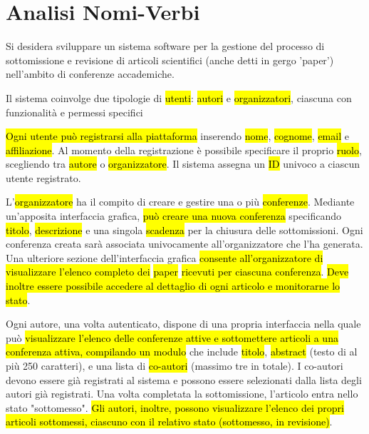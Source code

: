 \section{Analisi Nomi-Verbi}
\label{sec:analisi_nomi_verbi}
Si desidera sviluppare un sistema software per la gestione del
processo di sottomissione e revisione di articoli scientifici (anche
detti in gergo 'paper') nell’ambito di conferenze accademiche.
\bigskip

Il sistema coinvolge due tipologie di
\hl{utenti}:
\hl{autori} e
\hl{organizzatori}, ciascuna con funzionalità e
permessi specifici
\bigskip

\hl{Ogni utente può registrarsi alla
  piattaforma} inserendo \hl{nome},
\hl{cognome},
\hl{email} e
\hl{affiliazione}. Al momento della
registrazione è possibile specificare il proprio
\hl{ruolo}, scegliendo tra
\hl{autore} o
\hl{organizzatore}. Il sistema assegna un
\hl{ID} univoco a ciascun utente registrato.
\bigskip

L'\hl{organizzatore} ha il compito di creare e
gestire una o più \hl{conferenze}. Mediante
un’apposita interfaccia grafica, \hl{può creare
  una nuova conferenza} specificando
\hl{titolo},
\hl{descrizione} e una singola
\hl{scadenza} per la chiusura delle
sottomissioni. Ogni conferenza creata sarà associata univocamente
all’organizzatore che l’ha generata. Una ulteriore sezione
dell'interfaccia grafica \hl{consente
  all'organizzatore di visualizzare l’elenco completo dei}
\hl{paper} \hl{ricevuti per
  ciascuna conferenza}. \hl{Deve inoltre essere
  possibile accedere al dettaglio di ogni articolo e monitorarne lo
  stato}.  \bigskip

Ogni autore, una volta autenticato, dispone di una propria interfaccia
nella quale può \hl{visualizzare l'elenco delle
  conferenze attive e sottomettere articoli a una conferenza attiva,
  compilando un modulo} che include
\hl{titolo},
\hl{abstract} (testo di al più 250 caratteri),
e una lista di \hl{co-autori} (massimo tre in
totale). I co-autori devono essere già registrati al sistema e possono
essere selezionati dalla lista degli autori già registrati. Una volta
completata la sottomissione, l'articolo entra nello stato
"sottomesso". \hl{Gli autori, inoltre, possono
  visualizzare l'elenco dei propri articoli sottomessi, ciascuno con
  il relativo stato (sottomesso, in revisione)}.  \bigskip

